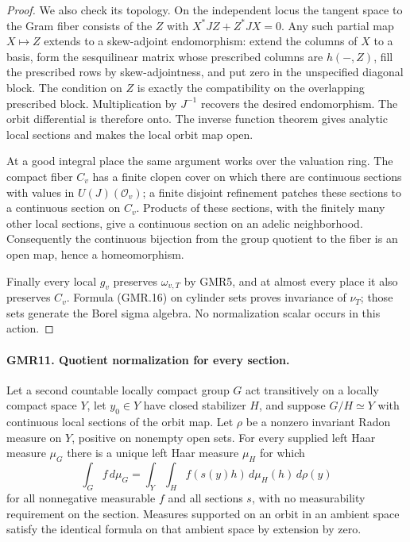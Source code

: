 \begin{proof}
We also check its topology.  On the independent locus the tangent
space to the Gram fiber consists of the $Z$ with
$X^*JZ+Z^*JX=0$.  Any such partial map $X\mapsto Z$ extends to a
skew-adjoint endomorphism: extend the columns of $X$ to a basis, form
the sesquilinear matrix whose prescribed columns are
$h(-,Z)$, fill the prescribed rows by skew-adjointness, and put zero
in the unspecified diagonal block.  The condition on $Z$ is exactly
the compatibility on the overlapping prescribed block.  Multiplication
by $J^{-1}$ recovers the desired endomorphism.  The orbit differential
is therefore onto.  The inverse function theorem gives analytic local
sections and makes the local orbit map open.

At a good integral place the same argument works over the valuation
ring.  The compact fiber $C_v$ has a finite clopen cover on which there
are continuous sections with values in $U(J)(\mathcal O_v)$; a finite
disjoint refinement patches these sections to a continuous section
on $C_v$.  Products of these sections, with the finitely many other
local sections, give a continuous section on an adelic neighborhood.
Consequently the continuous bijection from the group quotient to
the fiber is an open map, hence a homeomorphism.

Finally every local $g_v$ preserves $\omega_{v,T}$ by GMR5, and at
almost every place it also preserves $C_v$.  Formula (GMR.16) on
cylinder sets proves invariance of $\nu_T$; those sets generate the
Borel sigma algebra.  No normalization scalar occurs in this action.
\end{proof}

\paragraph{GMR11. Quotient normalization for every section.}
\label{claim:GMR11}
Let a second countable locally compact group $G$ act transitively on
a locally compact space $Y$, let $y_0\in Y$ have closed stabilizer $H$,
and suppose $G/H\simeq Y$ with continuous local sections of the orbit
map.  Let $\rho$ be a nonzero invariant Radon measure on $Y$, positive
on nonempty open sets.  For every supplied left Haar measure $\mu_G$
there is a unique left Haar measure $\mu_H$ for which
\[
 \int_G f\,d\mu_G
   =\int_Y\int_H f(s(y)h)\,d\mu_H(h)\,d\rho(y)
 \tag{GMR.19}
\]
for all nonnegative measurable $f$ and all sections $s$, with no
measurability requirement on the section.  Measures supported on an
orbit in an ambient space satisfy the identical formula on that
ambient space by extension by zero.

